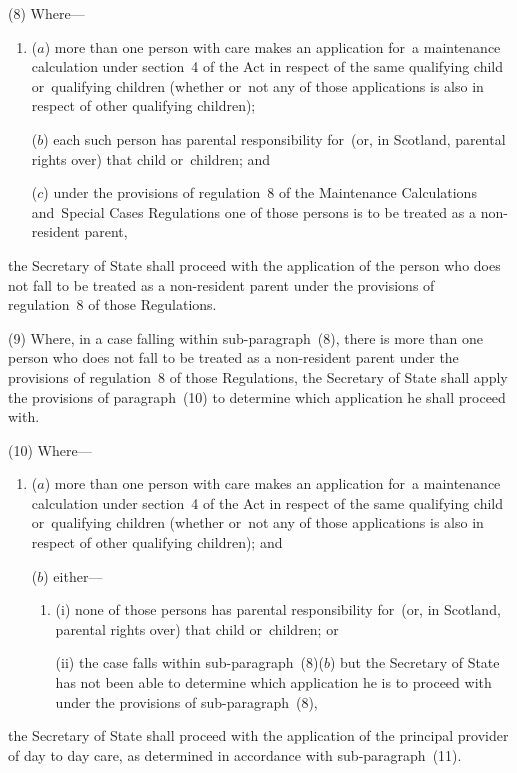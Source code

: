 \documentclass[12pt,a4paper]{article}
\begin{document}
(8) Where—
\begin{enumerate}\item[]
($a$) more than one person with care makes an application for~a maintenance calculation under section~4 of the Act in respect of the same qualifying child or~qualifying children (whether or~not any of those applications is also in respect of other qualifying children);

($b$) each such person has parental responsibility for~(or, in Scotland, parental rights over) that child or~children; and

($c$) under the provisions of regulation~8 of the Maintenance Calculations and~Special Cases Regulations one of those persons is to be treated as a non-resident parent,
\end{enumerate}
the Secretary of State shall proceed with the application of the person who does not fall to be treated as a non-resident parent under the provisions of regulation~8 of those Regulations.

(9) Where, in a case falling within sub-paragraph~(8), there is more than one person who does not fall to be treated as a non-resident parent under the provisions of regulation~8 of those Regulations, the Secretary of State shall apply the provisions of paragraph~(10) to determine which application he shall proceed with.

(10) Where—
\begin{enumerate}\item[]
($a$) more than one person with care makes an application for~a maintenance calculation under section~4 of the Act in respect of the same qualifying child or~qualifying children (whether or~not any of those applications is also in respect of other qualifying children); and

($b$) either—
\begin{enumerate}\item[]
(i) none of those persons has parental responsibility for~(or, in Scotland, parental rights over) that child or~children; or

(ii) the case falls within sub-paragraph~(8)($b$)  but the Secretary of State has not been able to determine which application he is to proceed with under the provisions of sub-paragraph~(8),
\end{enumerate}
\end{enumerate}
the Secretary of State shall proceed with the application of the principal provider of day to day care, as determined in accordance with sub-paragraph~(11).
\end{document}
